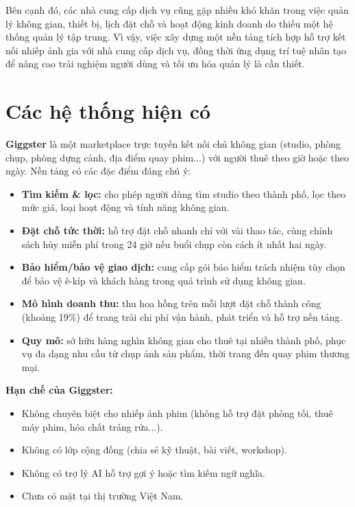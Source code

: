 Bên cạnh đó, các nhà cung cấp dịch vụ cũng gặp nhiều khó khăn trong việc quản lý không gian, thiết bị, lịch đặt chỗ và hoạt động kinh doanh do thiếu một hệ thống quản lý tập trung. Vì vậy, việc xây dựng một nền tảng tích hợp hỗ trợ kết nối nhiếp ảnh gia với nhà cung cấp dịch vụ, đồng thời ứng dụng trí tuệ nhân tạo để nâng cao trải nghiệm người dùng và tối ưu hóa quản lý là cần thiết.

\section{Các hệ thống hiện có}
\textbf{Giggster} là một marketplace trực tuyến kết nối chủ không gian (studio, phòng chụp, phòng dựng cảnh, địa điểm quay phim...) với người thuê theo giờ hoặc theo ngày. Nền tảng có các đặc điểm đáng chú ý:

\begin{itemize}
	\item \textbf{Tìm kiếm \& lọc:} cho phép người dùng tìm studio theo thành phố, lọc theo mức giá, loại hoạt động và tính năng không gian.
	\item \textbf{Đặt chỗ tức thời:} hỗ trợ đặt chỗ nhanh chỉ với vài thao tác, cùng chính sách hủy miễn phí trong 24 giờ nếu buổi chụp còn cách ít nhất hai ngày.
	\item \textbf{Bảo hiểm/bảo vệ giao dịch:} cung cấp gói bảo hiểm trách nhiệm tùy chọn để bảo vệ ê-kíp và khách hàng trong quá trình sử dụng không gian.
	\item \textbf{Mô hình doanh thu:} thu hoa hồng trên mỗi lượt đặt chỗ thành công (khoảng 19\%) để trang trải chi phí vận hành, phát triển và hỗ trợ nền tảng.
	\item \textbf{Quy mô:} sở hữu hàng nghìn không gian cho thuê tại nhiều thành phố, phục vụ đa dạng nhu cầu từ chụp ảnh sản phẩm, thời trang đến quay phim thương mại.
\end{itemize}

\textbf{Hạn chế của Giggster:}

\begin{itemize}
	\item Không chuyên biệt cho nhiếp ảnh phim (không hỗ trợ đặt phòng tối, thuê máy phim, hóa chất tráng rửa...).
	\item Không có lớp cộng đồng (chia sẻ kỹ thuật, bài viết, workshop).
	\item Không có trợ lý AI hỗ trợ gợi ý hoặc tìm kiếm ngữ nghĩa.
	\item Chưa có mặt tại thị trường Việt Nam.
\end{itemize}

